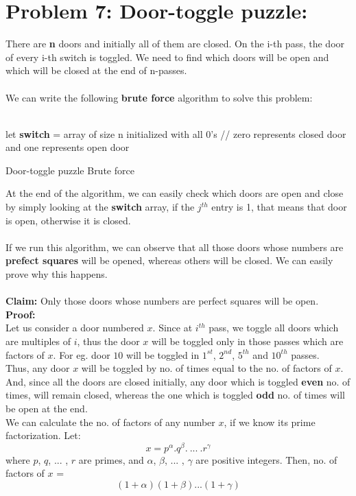 \documentclass[12pt]{report}
\begin{document}
\section{Problem 7: Door-toggle puzzle:}
There are \textbf{n} doors and initially all of them are closed. On the i-th pass, the door of every i-th switch is toggled. We need to find which doors will be open and which will be closed at the end of n-passes.  
\\ \\
We can write the following \textbf{brute force} algorithm to solve this problem:
\\ \\
\begin{algorithm}[H]
	\SetAlgoLined
	let \textbf{switch} = array of size n initialized with all 0's \; 
	// zero represents closed door and one represents open door \\
	\caption{Door-toggle puzzle Brute force}	
\end{algorithm}
At the end of the algorithm, we can easily check which doors are open and close by simply looking at the \textbf{switch} array, if the $j^{th}$ entry is 1, that means that door is open, otherwise it is closed.
\\ \\ 
If we run this algorithm, we can observe that all those doors whose numbers are \textbf{prefect squares} will be opened, whereas others will be closed. We can easily prove why this happens. 
\\ \\
\textbf{Claim: } Only those doors whose numbers are perfect squares will be open.
\\
\textbf{Proof: } \\
Let us consider a door numbered $x$. Since at $i^{th}$ pass, we toggle all doors which are multiples of $i$, thus the door $x$ will be toggled only in those passes which are factors of $x$. For eg. door $10$ will be toggled in $1^{st}$, $2^{nd}$, $5^{th}$ and $10^{th}$ passes. 
\\ 
Thus, any door $x$ will be toggled by no. of times equal to the no. of factors of $x$. 
\\ 
And, since all the doors are closed initially, any door which is toggled \textbf{even} no. of times, will remain closed, whereas the one which is toggled \textbf{odd} no. of times will be open at the end. 
\\
We can calculate the no. of factors of any number $x$, if we know its prime factorization. Let:
\[ x = p^{\alpha}.q^{\beta}.\ ...\ .r^{\gamma} \]
where $p$, $q$, ... , $r$ are primes, and $\alpha$, $\beta$, ... , $\gamma$ are positive integers. 
Then, no. of factors of $x$ = 
\[ (1 + \alpha)(1 + \beta)...(1 + \gamma) \]
\end{document}
